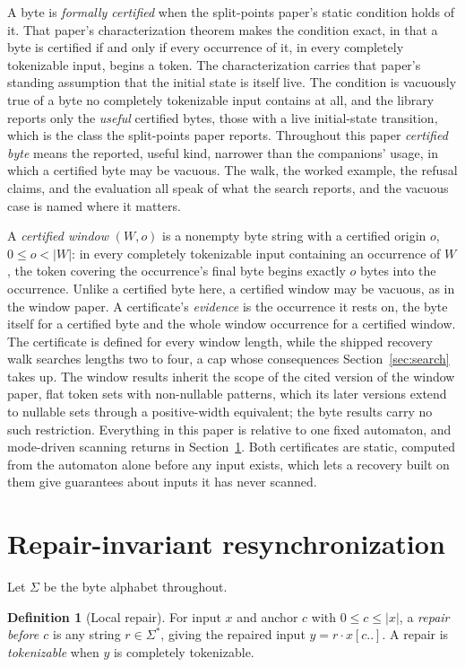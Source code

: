 \documentclass[11pt,a4paper]{article}
\theoremstyle{definition}
\newtheorem{definition}{Definition}
\theoremstyle{plain}
\theoremstyle{remark}
\newcommand{\suffix}[2]{#1[#2..]}
\begin{document}
A byte is \emph{formally certified} when the split-points paper's static condition holds of it. That paper's
characterization theorem makes the condition exact, in that a byte is certified if and only if every occurrence of it,
in every completely tokenizable input, begins a token. The characterization carries that paper's standing assumption
that the initial state is itself live. The condition is vacuously true of a byte no completely tokenizable input
contains at all, and the library reports only the \emph{useful} certified bytes, those with a live initial-state
transition, which is the class the split-points paper reports. Throughout this paper \emph{certified byte} means the
reported, useful kind, narrower than the companions' usage, in which a certified byte may be vacuous. The walk, the
worked example, the refusal claims, and the evaluation all speak of what the search reports, and the vacuous case is
named where it matters.

A \emph{certified window} $(W, o)$ is a nonempty byte string with a certified origin $o$, $0 \le o < |W|$: in every
completely tokenizable input containing an occurrence of $W$, the token covering the occurrence's final byte begins
exactly $o$ bytes into the occurrence. Unlike a certified byte here, a certified window may be vacuous, as in the window
paper. A certificate's \emph{evidence} is the occurrence it rests on, the byte itself for a certified byte and the whole
window occurrence for a certified window. The certificate is defined for every window length, while the shipped recovery
walk searches lengths two to four, a cap whose consequences Section~\ref{sec:search} takes up. The window results
inherit the scope of the cited version of the window paper, flat token sets with non-nullable patterns, which its later
versions extend to nullable sets through a positive-width equivalent; the byte results carry no such restriction.
Everything in this paper is relative to one fixed automaton, and mode-driven scanning returns in
Section~\ref{sec:repair}. Both certificates are static, computed from the automaton alone before any input exists, which
lets a recovery built on them give guarantees about inputs it has never scanned.

\section{Repair-invariant resynchronization}
\label{sec:repair}

Let $\Sigma$ be the byte alphabet throughout.
\begin{definition}[Local repair]
For input $x$ and anchor $c$ with $0 \le c \le |x|$, a \emph{repair before $c$} is any string $r \in \Sigma^{*}$, giving
the repaired input $y = r \cdot \suffix{x}{c}$. A repair is \emph{tokenizable} when $y$ is completely tokenizable.
\end{definition}
\end{document}
